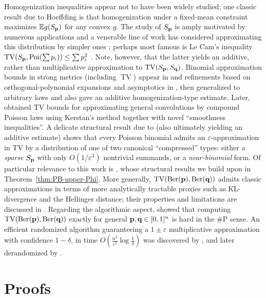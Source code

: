 \documentclass[11pt]{amsart}
\theoremstyle{plain}
\theoremstyle{definition}
\DeclareMathOperator{\TV}{TV}
\DeclareMathOperator{\Ber}{Ber}
\newcommand{\E}{\mathbb{E}}
\newcommand{\eps}{\varepsilon}
\renewcommand{\vec}[1]{\textup{{\bf #1}}}
\begin{document}
Homogenization inequalities appear not to have been widely studied;
one classic result due to
Hoeffding \cite{Hoeffding1956}
is that homogenization under a fixed-mean constraint maximizes $\E g(S_{\vec{p}})$
for any convex $g$.
The study of
$S_{\vec{p}}$
is amply motivated by numerous applications
and
a venerable line of work
has considered
approximating this distribution
by simpler ones
\cite{TangTang2023};
perhaps most famous is Le Cam's inequality $\TV(S_{\vec{p}},\mathrm{Poi}(\sum p_i))\le \sum{p_i^2}$ \cite{MR142174}.
Note, however, that the latter yields an additive, rather than multiplicative approximation to $\TV(S_{\vec{p}},S_{\vec{q}})$.
Binomial approximation bounds in strong metrics (including $\TV$) appear in
\cite{Ehm1991} and refinements based on orthogonal-polynomial expansions and asymptotics in
\cite{Roos2000}, then generalized
to arbitrary laws \cite{Roos2010ClosenessConvolutions}
and also gave an additive homogenization-type estimate.
Later, \cite{Roos2017RefinedTV}
obtained TV bounds for approximating general convolutions
by compound Poisson laws using Kerstan's method together with novel ``smoothness inequalities''.
A delicate structural result
due to
\cite{DaskalakisPapadimitriou2015SparseCovers}
(also ultimately yielding an additive estimate)
shows that
every Poisson binomial admits an $\eps$-approximation
in TV by a distribution of one of two canonical ``compressed'' types: either
a \emph{sparse} $S_{\vec{p}}$ with only $O(1/\eps^3)$ nontrivial summands, or a
\emph{near-binomial} form.
Of particular relevance to this work is \cite{BAILLON_COMINETTI_VAISMAN_2016, BarbourJensen1989LocalTailPoisson}, whose structural results we build upon in Theorem~\ref{thm:PB-upper-Phi}.
More generally, $\TV(\Ber(\vec{p}),\Ber(\vec{q}))$ admits classic approximations in terms of more analytically tractable
proxies such as KL-divergence and the Hellinger distance;
their properties and limitations are discussed in \cite{kon25tens}.
Regarding the algorithmic aspect,
\cite{DBLP:conf/ijcai/0001GMMPV23}
showed
that computing
$\TV(\Ber(\vec{p}),\Ber(\vec{q}))$
exactly
for general $\vec{p},\vec{q}\in[0,1]^n$
is hard in the
$\#$P sense.
An efficient randomized algorithm guaranteeing a $1\pm\eps$
multiplicative approximation with confidence $1-\delta$, in time $O(\frac{n^2}{\eps^2}\log\frac1\delta)$
was discovered by
\cite{FengApproxTV23},
and later
derandomized by
\cite{Feng24Deterministically}.
\section{Proofs}
\end{document}
